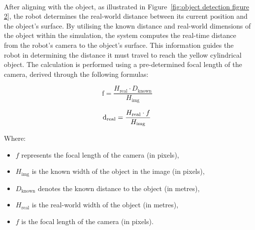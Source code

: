 \paragraph*{}
After aligning with the object, as illustrated in Figure~\ref{fig:object detection figure 2}, the robot determines the real-world distance between its current position and the object's surface. By utilising the known distance and real-world dimensions of the object within the simulation, the system computes the real-time distance from the robot's camera to the object's surface. This information guides the robot in determining the distance it must travel to reach the yellow cylindrical object. The calculation is performed using a pre-determined focal length of the camera, derived through the following formulas:

\begin{equation}
\text{f} = \frac{H_{\text{real}}\cdot D_{\text{known}}}{H_{\text{img}}}\
\label{eq: focal length}
\end{equation}

\begin{equation}
\text d_{\text{real}} = \frac{H_{\text{real}}\cdot f}{H_{\text{img}}}\
\label{eq: real world distance}
\end{equation}

Where:
\begin{itemize}
    \item \( f \) represents the focal length of the camera (in pixels),
    \item \( H_{\text{img}} \) is the known width of the object in the image (in pixels),
    \item \( D_{\text{known}} \) denotes the known distance to the object (in metres),
    \item \( H_{\text{real}} \) is the real-world width of the object (in metres),
    \item \( f \) is the focal length of the camera (in pixels).
\end{itemize}

